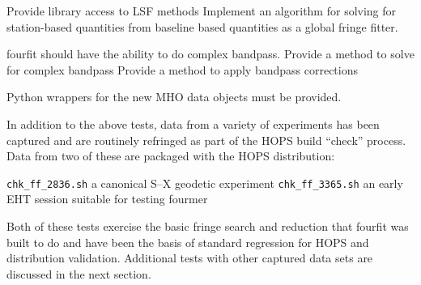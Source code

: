 \begin{description}
 Provide library access to \ac{LSF} methods
 Implement an algorithm for solving for station-based quantities
    from baseline based quantities as a global fringe fitter.

 \ac{fourfit} should have the ability to do complex bandpass.
 Provide a method to solve for complex bandpass
 Provide a method to apply bandpass corrections

 Python wrappers for the new \acs{MHO} data objects must be
    provided.
\end{description}


In addition to the above tests, data from a variety of experiments
has been captured and are routinely refringed as part of the
\ac{HOPS} build ``check'' process.  Data from two of
these are packaged with the \ac{HOPS} distribution:
\begin{description}
 \texttt{chk\_ff\_2836.sh} a canonical S--X geodetic experiment
 \texttt{chk\_ff\_3365.sh} an early \ac{EHT} session suitable for
    testing \ac{fourmer}
\end{description}
Both of these tests exercise the basic fringe search and reduction
that \ac{fourfit} was built to do and have been the basis of standard
regression for \ac{HOPS} and distribution validation.   Additional tests
with other captured data sets are discussed in the next section.

